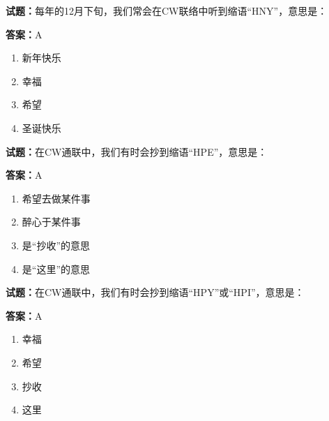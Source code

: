 \documentclass{ctexbook}
\begin{document}




\vspace{1em}

\textbf{试题：}每年的12月下旬，我们常会在CW联络中听到缩语“HNY”，意思是： 

\textbf{答案：}A 

\begin{enumerate}[leftmargin=3em]
  \item 新年快乐 

  \item 幸福 

  \item 希望 

  \item 圣诞快乐 

\end{enumerate}





\vspace{1em}

\textbf{试题：}在CW通联中，我们有时会抄到缩语“HPE”，意思是： 

\textbf{答案：}A 

\begin{enumerate}[leftmargin=3em]
  \item 希望去做某件事 

  \item 醉心于某件事 

  \item 是“抄收”的意思 

  \item 是“这里”的意思 

\end{enumerate}





\vspace{1em}

\textbf{试题：}在CW通联中，我们有时会抄到缩语“HPY”或“HPI”，意思是： 

\textbf{答案：}A 

\begin{enumerate}[leftmargin=3em]
  \item 幸福 

  \item 希望 

  \item 抄收 

  \item 这里 

\end{enumerate}
\end{document}
